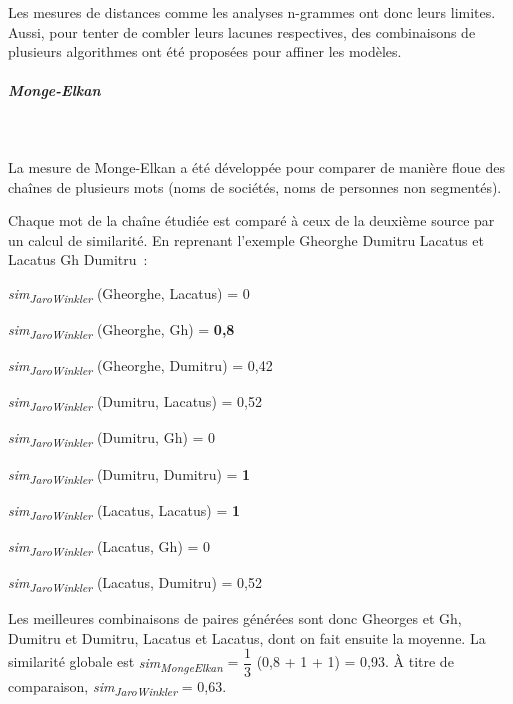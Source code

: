 \documentclass[a4paper,12pt,twoside]{book}
\begin{document}
                Les mesures de distances comme les analyses n-grammes ont donc leurs limites. Aussi, pour tenter de combler leurs lacunes respectives, des combinaisons de plusieurs algorithmes ont été proposées pour affiner les modèles.
                
                \subparagraph{Monge-Elkan}\mbox{} \\
                \label{monge}
                
                La mesure de Monge-Elkan a été développée pour comparer de manière floue des chaînes de plusieurs mots (noms de sociétés, noms de personnes non segmentés).
                
                Chaque mot de la chaîne étudiée est comparé à ceux de la deuxième source par un calcul de similarité. En reprenant l'exemple \og{}Gheorghe Dumitru Lacatus\fg{} et \og{}Lacatus Gh Dumitru\fg{}~:
                
                \textit{sim\textsubscript{JaroWinkler}} (Gheorghe, Lacatus) = 0
                
                \textit{sim\textsubscript{JaroWinkler}} (Gheorghe, Gh) = \textbf{0,8}
                
                \textit{sim\textsubscript{JaroWinkler}} (Gheorghe, Dumitru) = 0,42

                \textit{sim\textsubscript{JaroWinkler}} (Dumitru, Lacatus) = 0,52
                
                \textit{sim\textsubscript{JaroWinkler}} (Dumitru, Gh) = 0
                
                \textit{sim\textsubscript{JaroWinkler}} (Dumitru, Dumitru) = \textbf{1}
                
                \textit{sim\textsubscript{JaroWinkler}} (Lacatus, Lacatus) = \textbf{1}
                
                \textit{sim\textsubscript{JaroWinkler}} (Lacatus, Gh) = 0
                
                \textit{sim\textsubscript{JaroWinkler}} (Lacatus, Dumitru) = 0,52
                \newpage
                
                Les meilleures combinaisons de paires générées sont donc Gheorges et Gh, Dumitru et Dumitru, Lacatus et Lacatus, dont on fait ensuite la moyenne.
                \vspace{0.2cm}
                \newline
                La similarité globale est \textit{sim\textsubscript{MongeElkan}} = $ \dfrac{1}{3} $ (0,8 + 1 + 1) = 0,93.
                \vspace{0.2cm}
                \newline
                À titre de comparaison, \textit{sim\textsubscript{JaroWinkler}} = 0,63.
\end{document}
